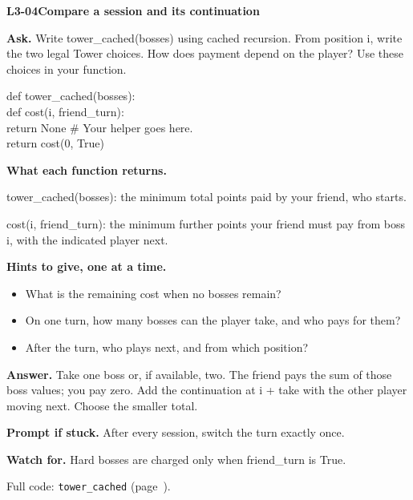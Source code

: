 \documentclass[11pt,a4paper]{article}
\begin{document}
\noindent\begin{minipage}{\textwidth}
{\color{teal}\textbf{L3-04}}\quad \textbf{Compare a session and its continuation}\par\smallskip
\textbf{Ask.} Write tower\_cached(bosses) using cached recursion. From position i, write the two legal Tower choices. How does payment depend on the player? Use these choices in your function.\par\smallskip
\par{}\par\smallskip\noindent\colorbox{codepaper}{\parbox{\dimexpr\linewidth-2\fboxsep\relax}{\small\ttfamily\raggedright def tower\_cached(bosses):\\\hspace*{2.4em}def cost(i, friend\_turn):\\\hspace*{4.8em}return None  \# Your helper goes here.\\\hspace*{2.4em}return cost(0, True)}}\par
{\small\textbf{What each function returns.}\par tower\_cached(bosses): the minimum total points paid by your friend, who starts.\par cost(i, friend\_turn): the minimum further points your friend must pay from boss i, with the indicated player next.\par }
{\small\textbf{Hints to give, one at a time.}}\begin{itemize}\item What is the remaining cost when no bosses remain?\item On one turn, how many bosses can the player take, and who pays for them?\item After the turn, who plays next, and from which position?\end{itemize}
\textbf{Answer.} Take one boss or, if available, two. The friend pays the sum of those boss values; you pay zero. Add the continuation at i + take with the other player moving next. Choose the smaller total.\par\smallskip
\textbf{Prompt if stuck.} After every session, switch the turn exactly once.\par\smallskip
\textbf{Watch for.} Hard bosses are charged only when friend\_turn is True.\par\smallskip Full code: \texttt{tower\_cached} (page~\pageref{L3-code-tower_cached}).
\end{minipage}\par{}\medskip
\end{document}
